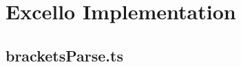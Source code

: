 \documentclass[12pt,a4paper,anyside,openright]{report}
\begin{document}







\pagestyle{plain}




\pagestyle{headings}















\appendix

\chapter{Excello Implementation}

\section{bracketsParse.ts}
\label{appendix:parenthesis}
{\scriptsize}




\end{document}
